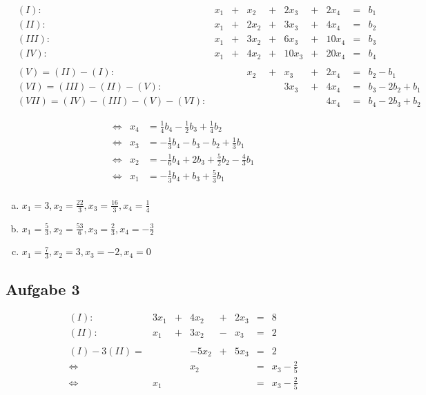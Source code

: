 \documentclass{article}
\begin{document}
    \begin{align*}
        &(I):& x_1 &+& x_2 &+& 2x_3 &+& 2x_4 &=& b_1 \\
        &(II):& x_1 &+& 2x_2 &+& 3x_3 &+& 4x_4 &=& b_2 \\
        &(III):& x_1 &+& 3x_2 &+& 6x_3 &+& 10x_4 &=& b_3 \\
        &(IV):& x_1 &+& 4x_2 &+& 10x_3 &+& 20x_4 &=& b_4 \\ \\
        &(V) = (II) - (I):&&& x_2 &+& x_3 &+& 2x_4 &=& b_2 - b_1 \\ 
        &(VI) = (III) - (II) - (V):&&&&& 3x_3 &+& 4x_4 &=& b_3 - 2b_2 + b_1 \\
        &(VII) = (IV) - (III) - (V) - (VI):&&&&&&& 4x_4 &=& b_4 - 2b_3 + b_2 
    \end{align*}

    \begin{align*}
        &\Leftrightarrow& x_4 &= \frac14 b_4 - \frac12 b_3 + \frac14 b_2 \\
        &\Leftrightarrow& x_3 &= -\frac13 b_4 - b_3 - b_2 + \frac13 b_1 \\
        &\Leftrightarrow& x_2 &= -\frac16 b_4 + 2b_3 + \frac52 b_2 - \frac43 b_1 \\
        &\Leftrightarrow& x_1 &= -\frac13 b_4 + b_3 + \frac53 b_1 \\
    \end{align*}

    \begin{enumerate}[a)]
        \item $x_1 = 3, x_2 = \frac{22}{3} , x_3 = \frac{16}{3}, x_4 = \frac14$
        \item $x_1 = \frac53, x_2 = \frac{53}{6}, x_3 = \frac23, x_4 = -\frac32$
        \item $x_1 = \frac73, x_2 = 3, x_3 = -2, x_4 = 0$
    \end{enumerate}


    \subsection{Aufgabe 3}

    \begin{align*}
        &(I):& 3x_1 &+& 4x_2 &+& 2x_3 &=& 8 \\
        &(II):& x_1 &+& 3x_2 &-& x_3 &=& 2 \\\\
        &(I) - 3(II) =&&& -5x_2 &+& 5x_3 &=& 2 \\
        &\Leftrightarrow &&& x_2 && &=& x_3 - \frac25 \\
        &\Leftrightarrow& x_1 &&&&&=& x_3 - \frac25
    \end{align*}
\end{document}
